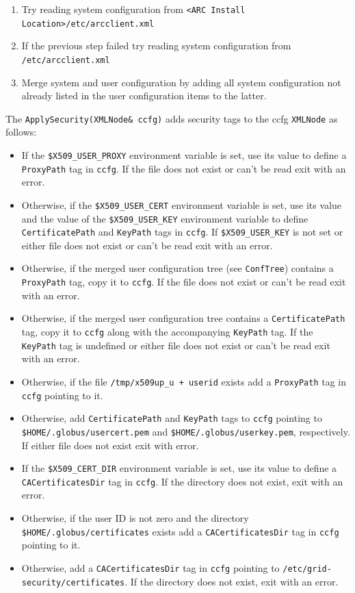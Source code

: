 \documentclass{book}
\newcommand{\XMLNode}{\texttt{XMLNode}}
\begin{document}
\begin{enumerate}
\item{Try reading system configuration from \texttt{<ARC Install
    Location>/etc/arcclient.xml}}
\item{If the previous step failed try reading system configuration
  from \texttt{/etc/arcclient.xml}}
\item{Merge system and user configuration by adding all system
  configuration not already listed in the user configuration items to the
  latter.}
\end{enumerate}

The \texttt{ApplySecurity(XMLNode\& ccfg)} adds security tags to the
ccfg {\XMLNode} as follows:

\begin{itemize}
\item{If the \texttt{\$X509\_USER\_PROXY} environment variable is set,
  use its value to define a \texttt{ProxyPath} tag in \texttt{ccfg}. If
  the file does not exist or can't be read exit with an error.}
\item{Otherwise, if the \texttt{\$X509\_USER\_CERT} environment
  variable is set, use its value and the value of the
  \texttt{\$X509\_USER\_KEY} environment variable to define
  \texttt{CertificatePath} and \texttt{KeyPath} tags in \texttt{ccfg}.
  If \texttt{\$X509\_USER\_KEY} is not set or either file does not
  exist or can't be read exit with an error.}
\item{Otherwise, if the merged user configuration tree (see
  \texttt{ConfTree}) contains a \texttt{ProxyPath} tag, copy it to
  \texttt{ccfg}. If the file does not exist or can't be read exit with
  an error.}
\item{Otherwise, if the merged user configuration tree contains a
  \texttt{CertificatePath} tag, copy it to \texttt{ccfg} along with the
  accompanying \texttt{KeyPath} tag. If the \texttt{KeyPath} tag is
  undefined or either file does not exist or can't be read exit with
  an error.}
\item{Otherwise, if the file \texttt{/tmp/x509up\_u + userid} exists
  add a \texttt{ProxyPath} tag in \texttt{ccfg} pointing to it.}
\item{Otherwise, add \texttt{CertificatePath} and \texttt{KeyPath}
  tags to \texttt{ccfg} pointing to
  \texttt{\$HOME/.globus/usercert.pem} and
  \texttt{\$HOME/.globus/userkey.pem}, respectively. If either file
  does not exist exit with error.}
\item{If the \texttt{\$X509\_CERT\_DIR} environment variable is set,
  use its value to define a \texttt{CACertificatesDir} tag in
  \texttt{ccfg}. If the directory does not exist, exit with an error.}
\item{Otherwise, if the user ID is not zero and the directory
  \texttt{\$HOME/.globus/certificates} exists add a
  \texttt{CACertificatesDir} tag in \texttt{ccfg} pointing to it.}
\item{Otherwise, add a \texttt{CACertificatesDir} tag in \texttt{ccfg}
  pointing to \texttt{/etc/grid-security/certificates}. If the
  directory does not exist, exit with an error.}
\end{itemize}
\end{document}
